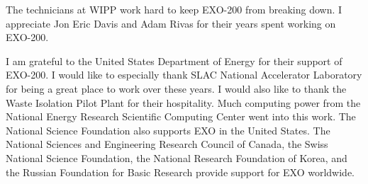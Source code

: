 The technicians at WIPP work hard to keep EXO-200 from breaking down. I appreciate Jon Eric Davis and Adam Rivas for their years spent working on EXO-200.

I am grateful to the United States Department of Energy for their support of EXO-200. I would like to especially thank SLAC National Accelerator Laboratory for being a great place to work over these years. I would also like to thank the Waste Isolation Pilot Plant for their hospitality. Much computing power from the National Energy Research Scientific Computing Center went into this work. The National Science Foundation also supports EXO in the United States. The National Sciences and Engineering Research Council of Canada, the Swiss National Science Foundation, the National Research Foundation of Korea, and the Russian Foundation for Basic Research provide support for EXO worldwide.
